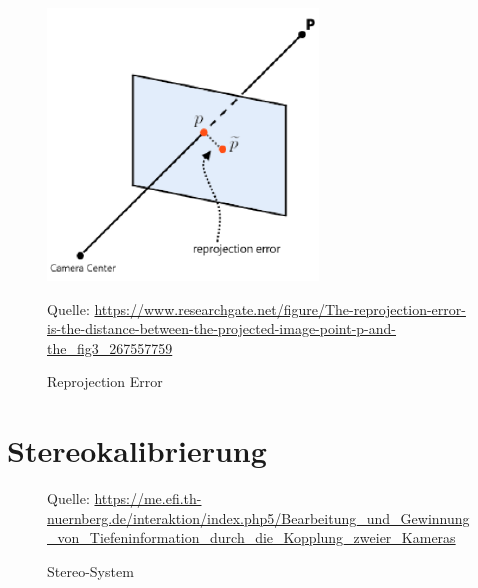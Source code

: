 \begin{figure}[H]
	\includegraphics[scale=0.75]{bilder/repro_error}
	\caption[Reprojection Error]{Reprojection Error}
	\label{fig:repro}%
	\small Quelle: \url{https://www.researchgate.net/figure/The-reprojection-error-is-the-distance-between-the-projected-image-point-p-and-the_fig3_267557759}
\end{figure}

\section{Stereokalibrierung}
\label{sec:stereokalibrierung}

\begin{figure}%
	\centering
	\qquad
	\caption{Stereo-System}%
	\small Quelle: \url{https://me.efi.th-nuernberg.de/interaktion/index.php5/Bearbeitung_und_Gewinnung_von_Tiefeninformation_durch_die_Kopplung_zweier_Kameras}
	\label{fig:stereo1}%
\end{figure}

